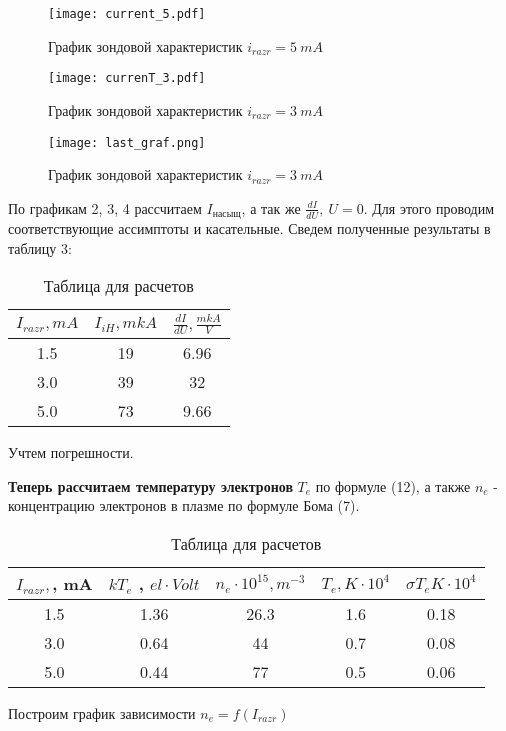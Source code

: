 \documentclass[a4paper,12pt]{article}
\begin{document}
\begin{figure}[h!]
	\centering
	\texttt{[image: current\_5.pdf]}
	\caption{График зондовой характеристик $i_{razr} = 5 \: mA$}
	\label{C}
\end{figure}

\begin{figure}[h!]
	\centering
	\texttt{[image: currenT\_3.pdf]}
	\caption{График зондовой характеристик $i_{razr} = 3 \: mA$}
	\label{C}
\end{figure}
\begin{figure}[h!]
	\centering
	\texttt{[image: last\_graf.png]}
	\caption{График зондовой характеристик $i_{razr} = 3 \: mA$}
	\label{C}
\end{figure}
\newpage
По графикам 2, 3, 4 рассчитаем $I_{насыщ}$, а так же $\frac{dI}{dU}, \: U = 0$.
Для этого проводим соответствующие ассимптоты и касательные. Сведем полученные результаты в таблицу 3:
	
\begin{table}[!]
    \caption{Таблица для расчетов}
    \begin{center}
        \begin{tabular}{|c|c|c|}
            \hline
            $I_{razr}, mA$ & $I_{iH}, mkA$ & $\frac{dI}{dU}, \frac{mkA}{V}$ \\
            \hline
        1.5 & 19 & 6.96  \\
            \hline
        3.0 & 39 & 32 \\
            \hline
        5.0 & 73 & 9.66 \\
            \hline
        \end{tabular}
    \end{center}
  \end{table}
  
  Учтем погрешности.

  \textbf{Теперь рассчитаем температуру электронов} $T_e$ по формуле (12), а также $n_e$ - концентрацию электронов в плазме по формуле Бома (7).
  
  \begin{table}[!]
    \caption{Таблица для расчетов}
    \begin{center}
        \begin{tabular}{|c|c|c|c|c|}
            \hline
        $ I_{razr}, $, mA  & $ kT_e $ , $el \cdot Volt $  & $n_e \cdot 10^{15}, m^{-3}$ & $T_e, K \cdot 10^{4}$ & $\sigma{T_e}  K \cdot 10^{4}$ \\
            \hline
        1.5 & 1.36 & 26.3 & 1.6 & 0.18 \\
            \hline
        3.0 & 0.64 & 44 & 0.7 & 0.08 \\
            \hline
        5.0 & 0.44 & 77 & 0.5 & 0.06 \\
            \hline
        \end{tabular}
    \end{center}
  \label{B_table}
  \end{table}
  Построим график зависимости $ n_{e} = f(I_{razr})$
\end{document}
